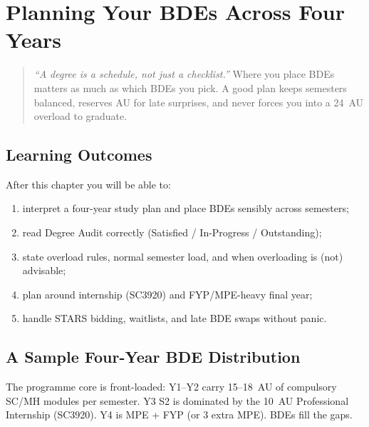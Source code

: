 \chapter{Planning Your BDEs Across Four Years}
\label{ch:planning}

\begin{quote}
\emph{``A degree is a schedule, not just a checklist.''} Where you place BDEs matters as much as which BDEs you pick. A good plan keeps semesters balanced, reserves AU for late surprises, and never forces you into a 24~AU overload to graduate.
\end{quote}

\noindent{}
\vspace{0.4em}

\section*{Learning Outcomes}
After this chapter you will be able to:
\begin{enumerate}[label=(L\arabic*)]
    \item interpret a four-year study plan and place BDEs sensibly across semesters;
    \item read Degree Audit correctly (Satisfied / In-Progress / Outstanding);
    \item state overload rules, normal semester load, and when overloading is (not) advisable;
    \item plan around internship (SC3920) and FYP/MPE-heavy final year;
    \item handle STARS bidding, waitlists, and late BDE swaps without panic.
\end{enumerate}

\section{A Sample Four-Year BDE Distribution}
\label{sec:four-year-plan}

The programme core is front-loaded: Y1--Y2 carry 15--18~AU of compulsory SC/MH modules per semester. Y3 S2 is dominated by the 10~AU Professional Internship (SC3920). Y4 is MPE + FYP (or 3 extra MPE). BDEs fill the gaps.

